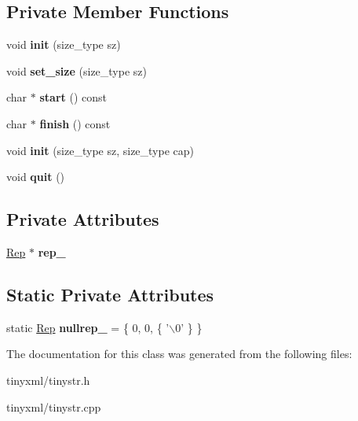 \subsection*{\-Private \-Member \-Functions}
\begin{DoxyCompactItemize}
\item 
\hypertarget{class_ti_xml_string_a694eacb51c43d8eba8aa7d4552b598ff}{void {\bfseries init} (size\-\_\-type sz)}\label{class_ti_xml_string_a694eacb51c43d8eba8aa7d4552b598ff}

\item 
\hypertarget{class_ti_xml_string_a5d70615367bf2920c25feddf6ac4ad30}{void {\bfseries set\-\_\-size} (size\-\_\-type sz)}\label{class_ti_xml_string_a5d70615367bf2920c25feddf6ac4ad30}

\item 
\hypertarget{class_ti_xml_string_a36417caceebe25352f53a87e8cd966b4}{char $\ast$ {\bfseries start} () const }\label{class_ti_xml_string_a36417caceebe25352f53a87e8cd966b4}

\item 
\hypertarget{class_ti_xml_string_a58faf1c6b9828c8d5d5092bebf146167}{char $\ast$ {\bfseries finish} () const }\label{class_ti_xml_string_a58faf1c6b9828c8d5d5092bebf146167}

\item 
\hypertarget{class_ti_xml_string_ae11cd23e090fd2e7bb62eda05b45a2d6}{void {\bfseries init} (size\-\_\-type sz, size\-\_\-type cap)}\label{class_ti_xml_string_ae11cd23e090fd2e7bb62eda05b45a2d6}

\item 
\hypertarget{class_ti_xml_string_aa6008ae51286a342cd366fbf1e3eeafc}{void {\bfseries quit} ()}\label{class_ti_xml_string_aa6008ae51286a342cd366fbf1e3eeafc}

\end{DoxyCompactItemize}
\subsection*{\-Private \-Attributes}
\begin{DoxyCompactItemize}
\item 
\hypertarget{class_ti_xml_string_ac7be48f31ca451bcb16de428b5c40e0c}{\hyperlink{struct_ti_xml_string_1_1_rep}{\-Rep} $\ast$ {\bfseries rep\-\_\-}}\label{class_ti_xml_string_ac7be48f31ca451bcb16de428b5c40e0c}

\end{DoxyCompactItemize}
\subsection*{\-Static \-Private \-Attributes}
\begin{DoxyCompactItemize}
\item 
\hypertarget{class_ti_xml_string_ae1f9e0de28328eed27d5623ff67a3191}{static \hyperlink{struct_ti_xml_string_1_1_rep}{\-Rep} {\bfseries nullrep\-\_\-} = \{ 0, 0, \{ '$\backslash$0' \} \}}\label{class_ti_xml_string_ae1f9e0de28328eed27d5623ff67a3191}

\end{DoxyCompactItemize}


\-The documentation for this class was generated from the following files\-:\begin{DoxyCompactItemize}
\item 
tinyxml/tinystr.\-h\item 
tinyxml/tinystr.\-cpp\end{DoxyCompactItemize}
